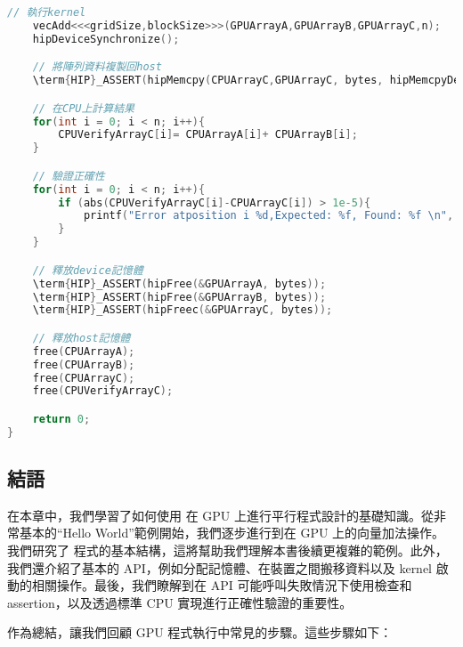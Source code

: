 \begin{lstlisting}[language=C, caption={完整的VectorAdd範例程式碼}, label={8th:example}]
    // 執行kernel
    vecAdd<<<gridSize,blockSize>>>(GPUArrayA,GPUArrayB,GPUArrayC,n);
    hipDeviceSynchronize();

    // 將陣列資料複製回host
    \term{HIP}_ASSERT(hipMemcpy(CPUArrayC,GPUArrayC, bytes, hipMemcpyDeviceToHost));

    // 在CPU上計算結果
    for(int i = 0; i < n; i++){
        CPUVerifyArrayC[i]= CPUArrayA[i]+ CPUArrayB[i];
    }

    // 驗證正確性
    for(int i = 0; i < n; i++){
        if (abs(CPUVerifyArrayC[i]-CPUArrayC[i]) > 1e-5){
            printf("Error atposition i %d,Expected: %f, Found: %f \n", i, CPUVerifyArrayC[i], CPUArrayC[i]);
        }
    }

    // 釋放device記憶體
    \term{HIP}_ASSERT(hipFree(&GPUArrayA, bytes));
    \term{HIP}_ASSERT(hipFree(&GPUArrayB, bytes));
    \term{HIP}_ASSERT(hipFreec(&GPUArrayC, bytes));

    // 釋放host記憶體
    free(CPUArrayA);
    free(CPUArrayB);
    free(CPUArrayC);
    free(CPUVerifyArrayC);

    return 0;
}
\end{lstlisting}

\subsection{結語}
在本章中，我們學習了如何使用  在 GPU 上進行平行程式設計的基礎知識。從非常基本的“Hello World”範例開始，我們逐步進行到在 GPU 上的向量加法操作。我們研究了  程式的基本結構，這將幫助我們理解本書後續更複雜的範例。此外，我們還介紹了基本的 API，例如分配記憶體、在裝置之間搬移資料以及 kernel 啟動的相關操作。最後，我們瞭解到在 API 可能呼叫失敗情況下使用檢查和assertion，以及透過標準 CPU 實現進行正確性驗證的重要性。

作為總結，讓我們回顧 GPU 程式執行中常見的步驟。這些步驟如下：

